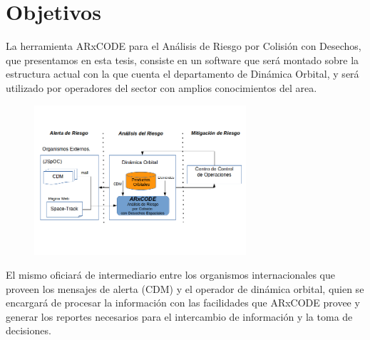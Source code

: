 \section{Objetivos}

La herramienta ARxCODE para el An\'alisis de Riesgo por Colisi\'on con Desechos, que presentamos en esta tesis, consiste en un software que ser\'a montado sobre la estructura actual con la que cuenta el departamento de Din\'amica Orbital, y ser\'a utilizado por operadores del sector con amplios conocimientos del area.\\
\begin{figure}[!h]
\centering
  \includegraphics[width=0.7\textwidth]{imagenes/interfasessistemas}
\end{figure}
El mismo oficiar\'a de intermediario entre los organismos internacionales que proveen los mensajes de alerta (CDM) y el operador de din\'amica orbital, quien se encargar\'a de procesar la informaci\'on con las facilidades que ARxCODE provee y generar los reportes necesarios para el intercambio de informaci\'on y la toma de decisiones.\\ 

